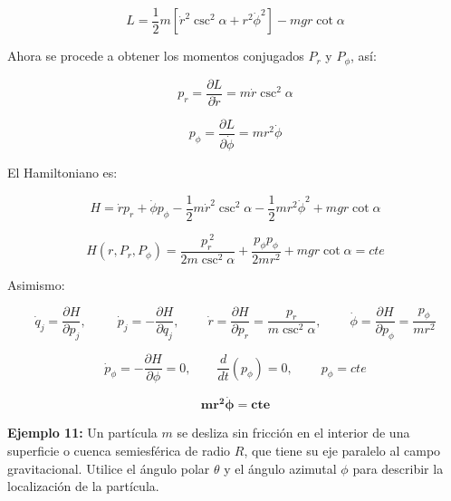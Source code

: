 \documentclass[]{article}
\begin{document}
\[L = \frac{1}{2}m\left\lbrack {\dot{r}}^{2}\csc^{2}\alpha + r^{2}{\dot{\phi}}^{2} \right\rbrack - mgr\cot\alpha\]

Ahora se procede a obtener los momentos conjugados \(P_{r}\) y
\(P_{\phi}\), así:

\[p_{r} = \frac{\partial L}{\partial\dot{r}} = m\dot{r}\csc^{2}\alpha\]

\[p_{\phi} = \frac{\partial L}{\partial\dot{\phi}} = mr^{2}\dot{\phi}\]

El Hamiltoniano es:

\[H = \dot{r}p_{r} + \dot{\phi}p_{\phi} - \frac{1}{2}m{\dot{r}}^{2}\csc^{2}\alpha - \frac{1}{2}mr^{2}{\dot{\phi}}^{2} + mgr\cot\alpha\]

\[H\left( r,P_{r},P_{\phi} \right) = \frac{p_{r}^{\ 2}}{2m\csc^{2}\alpha} + \frac{p_{\phi}p_{\phi}}{2mr^{2}} + mgr\cot\alpha = cte\]

Asimismo:

\[{\dot{q}}_{j} = \frac{\partial H}{\partial p_{j}},\ \ \ \ \ \ \ \ \ \ \ {\dot{p}}_{j} = - \frac{\partial H}{\partial q_{j}},\ \ \ \ \ \ \ \ \ \ \dot{r} = \frac{\partial H}{\partial p_{r}} = \frac{p_{r}}{m\csc^{2}\alpha},\ \ \ \ \ \ \ \ \ \ \dot{\phi} = \frac{\partial H}{\partial p_{\phi}} = \frac{p_{\phi}}{mr^{2}}\]

\[{\dot{p}}_{\phi} = - \frac{\partial H}{\partial\phi} = 0,\ \ \ \ \ \ \ \ \ \frac{d}{dt}\left( p_{\phi} \right) = 0,\ \ \ \ \ \ \ \ \ \ p_{\phi} = cte\]

\[\mathbf{m}\mathbf{r}^{\mathbf{2}}\dot{\mathbf{\phi}}\mathbf{= cte}\]

\textbf{Ejemplo 11:} Un partícula \(m\) se desliza sin fricción en el
interior de una superficie o cuenca semiesférica de radio \(R\), que
tiene su eje paralelo al campo gravitacional. Utilice el ángulo polar
\(\theta\) y el ángulo azimutal \(\phi\) para describir la localización
de la partícula.
\end{document}
